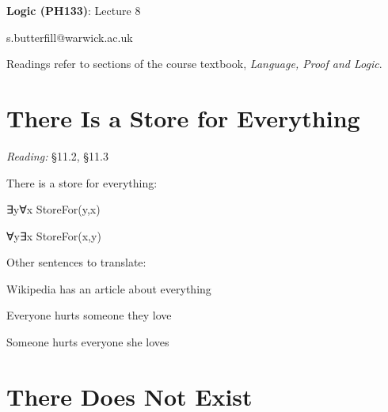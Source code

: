\documentclass[12pt]{extarticle}
\date{}
\makeatletter
\def \ititle {Origins of Mind}
\def \isubtitle {Lecture 08}
\def \iemail{s.butterfill@warwick.ac.uk}
\makeatother
\begin{document}

\begin{multicols*}{3}

\setlength\footnotesep{1em}







\def \ititle {Logic (PH133)}
 
\def \isubtitle {Lecture 8}
 
\begin{center}
 
{\Large
 
\textbf{\ititle}: \isubtitle
 
}
 
 
 
\iemail %
 
\end{center}
 
Readings refer to sections of the course textbook, \emph{Language, Proof and Logic}.
 
 
 
\section{There Is a Store for Everything}
 
\emph{Reading:} §11.2, §11.3
 
There is a store for everything:
 
\hspace{3mm}	∃y∀x StoreFor(y,x)
 
\hspace{3mm} ∀y∃x StoreFor(x,y)
 
Other sentences to translate:
 
\hspace{3mm} Wikipedia has an article about everything
 
\hspace{3mm} Everyone hurts someone they love
 
\hspace{3mm} Someone hurts everyone she loves
 
 
 
\section{There Does Not Exist}
 

\end{multicols*}
\end{document}
